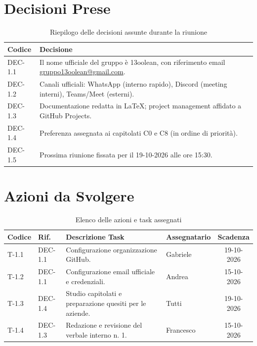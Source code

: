 \documentclass[11pt, a4paper]{article}
\makeatletter
\newcommand{\GroupName}{13oolean}
\newcommand{\GroupEmail}{\href{mailto:gruppo13oolean@gmail.com}{gruppo13oolean@gmail.com}}
\makeatother
\begin{document}
\section{Decisioni Prese}

\begin{table}[htbp]
\centering
\caption{Riepilogo delle decisioni assunte durante la riunione}
\label{tab:decisioni}
\begin{tabularx}{\textwidth}{l X}
\toprule
\textbf{Codice} & \textbf{Decisione} \\
\midrule
DEC-1.1 & Il nome ufficiale del gruppo è \GroupName, con riferimento email \GroupEmail. \\
DEC-1.2 & Canali ufficiali: WhatsApp (interno rapido), Discord (meeting interni), Teams/Meet (esterni). \\
DEC-1.3 & Documentazione redatta in \LaTeX; project management affidato a GitHub Projects. \\
DEC-1.4 & Preferenza assegnata ai capitolati C0 e C8 (in ordine di priorità). \\
DEC-1.5 & Prossima riunione fissata per il 19-10-2026 alle ore 15:30. \\
\bottomrule
\end{tabularx}
\end{table}

\section{Azioni da Svolgere}

\begin{table}[htbp]
\centering
\caption{Elenco delle azioni e task assegnati}
\label{tab:azioni}
\begin{tabularx}{\textwidth}{l l X l c}
\toprule
\textbf{Codice} & \textbf{Rif.} & \textbf{Descrizione Task} & \textbf{Assegnatario} & \textbf{Scadenza} \\
\midrule
T-1.1 & DEC-1.1 & Configurazione organizzazione GitHub. & Gabriele & 19-10-2026 \\
T-1.2 & DEC-1.1 & Configurazione email ufficiale e credenziali.                 & Andrea   & 15-10-2026 \\
T-1.3 & DEC-1.4 & Studio capitolati e preparazione quesiti per le aziende.      & Tutti    & 19-10-2026 \\
T-1.4 & DEC-1.3 & Redazione e revisione del verbale interno n. 1.              & Francesco & 15-10-2026 \\
\bottomrule
\end{tabularx}
\end{table}
\end{document}
